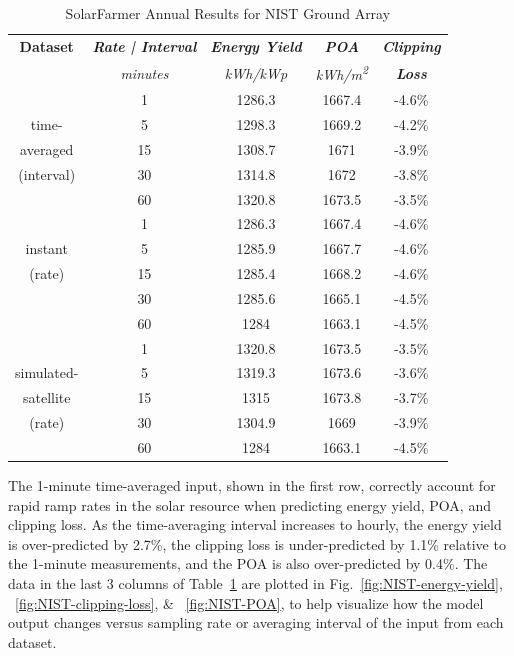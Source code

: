 \documentclass[conference]{IEEEtran}
\begin{document}
\begin{table}[htbp]
\caption{SolarFarmer Annual Results for NIST Ground Array}
\begin{center}
\begin{tabular}{|c|c|c|c|c|}
\hline
\textbf{Dataset} & \textbf{\textit{Rate | Interval}}& \textbf{\textit{Energy Yield}}& \textbf{\textit{POA}}& \textbf{\textit{Clipping}} \\
                 & \textit{minutes}& \textit{kWh/kWp}& \textit{kWh/m\textsuperscript{2}}& \textbf{\textit{Loss}} \\
\hline
             &  1& 1286.3& 1667.4& -4.6\% \\
time-        &  5& 1298.3& 1669.2& -4.2\% \\
averaged     & 15& 1308.7& 1671  & -3.9\% \\
(interval)   & 30& 1314.8& 1672  & -3.8\% \\
             & 60& 1320.8& 1673.5& -3.5\% \\
\hline
             &  1& 1286.3& 1667.4& -4.6\% \\
instant      &  5& 1285.9& 1667.7& -4.6\% \\
(rate)       & 15& 1285.4& 1668.2& -4.6\% \\
             & 30& 1285.6& 1665.1& -4.5\% \\
             & 60& 1284  & 1663.1& -4.5\% \\
\hline
             &  1& 1320.8& 1673.5& -3.5\% \\
simulated-   &  5& 1319.3& 1673.6& -3.6\% \\
satellite    & 15& 1315  & 1673.8& -3.7\% \\
(rate)       & 30& 1304.9& 1669  & -3.9\% \\
             & 60& 1284  & 1663.1& -4.5\% \\
\hline
\end{tabular}
\label{table:results-summary}
\end{center}
\end{table}

The 1-minute time-averaged input, shown in the first row, correctly account for rapid ramp rates in the solar resource when predicting energy yield, POA, and clipping loss. As the time-averaging interval increases to hourly, the energy yield is over-predicted by 2.7\%, the clipping loss is under-predicted by 1.1\% relative to the 1-minute measurements, and the POA is also over-predicted by 0.4\%. The data in the last 3 columns of Table~\ref{table:results-summary} are plotted in Fig.~\ref{fig:NIST-energy-yield}, ~\ref{fig:NIST-clipping-loss}, \& ~\ref{fig:NIST-POA}, to help visualize how the model output changes versus sampling rate or averaging interval of the input from each dataset.
\end{document}
